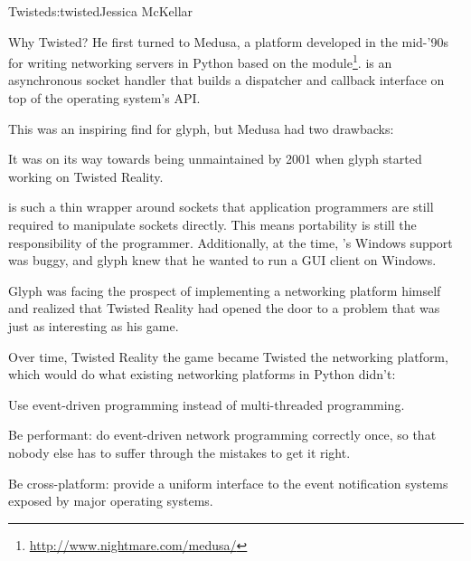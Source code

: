 \begin{aosachapter}{Twisted}{s:twisted}{Jessica McKellar}
\begin{aosasect1}{Why Twisted?}
He first turned to Medusa, a platform developed in the mid-'90s for
writing networking servers in Python based on the 
module\footnote{\url{http://www.nightmare.com/medusa/}}. 
is an asynchronous socket handler that builds a dispatcher and
callback interface on top of the operating system's  API.

This was an inspiring find for glyph, but Medusa had two drawbacks:

\begin{aosaenumerate}

\item It was on its way towards being unmaintained by 2001 when glyph
  started working on Twisted Reality.

\item {} is such a thin wrapper around sockets that
  application programmers are still required to manipulate sockets
  directly. This means portability is still the responsibility of the
  programmer. Additionally, at the time, 's Windows
  support was buggy, and glyph knew that he wanted to run a GUI client
  on Windows.

\end{aosaenumerate}

Glyph was facing the prospect of implementing a networking platform himself
and realized that Twisted Reality had opened the door to a problem that was just
as interesting as his game.

Over time, Twisted Reality the game became Twisted the networking platform,
which would do what existing networking platforms in Python didn't:

\begin{aosaitemize}

\item Use event-driven programming instead of multi-threaded
  programming.

\item Be performant: do event-driven network programming correctly
  once, so that nobody else has to suffer through the mistakes to get
  it right.

\item Be cross-platform: provide a uniform interface to the event
  notification systems exposed by major operating systems.


\end{aosaitemize}
\end{aosasect1}
\end{aosachapter}
